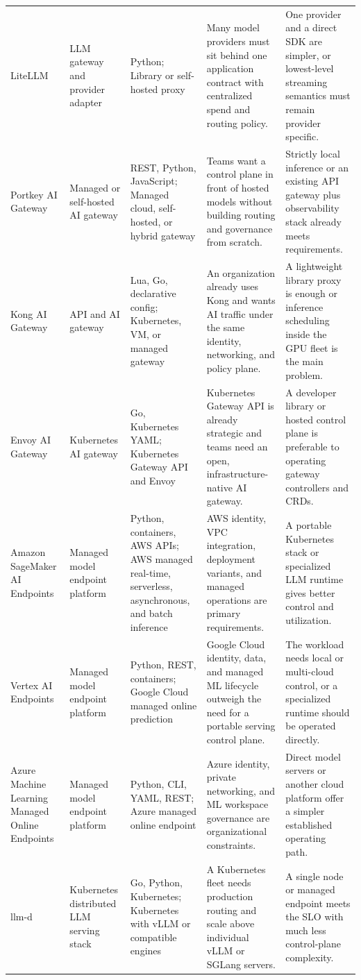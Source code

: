 \begin{longtable}{@{}p{20mm}p{22mm}p{26mm}p{46mm}p{46mm}@{}}
LiteLLM & LLM gateway and provider adapter & Python; Library or self-hosted proxy & Many model providers must sit behind one application contract with centralized spend and routing policy. & One provider and a direct SDK are simpler, or lowest-level streaming semantics must remain provider specific.\\
Portkey AI Gateway & Managed or self-hosted AI gateway & REST, Python, JavaScript; Managed cloud, self-hosted, or hybrid gateway & Teams want a control plane in front of hosted models without building routing and governance from scratch. & Strictly local inference or an existing API gateway plus observability stack already meets requirements.\\
Kong AI Gateway & API and AI gateway & Lua, Go, declarative config; Kubernetes, VM, or managed gateway & An organization already uses Kong and wants AI traffic under the same identity, networking, and policy plane. & A lightweight library proxy is enough or inference scheduling inside the GPU fleet is the main problem.\\
Envoy AI Gateway & Kubernetes AI gateway & Go, Kubernetes YAML; Kubernetes Gateway API and Envoy & Kubernetes Gateway API is already strategic and teams need an open, infrastructure-native AI gateway. & A developer library or hosted control plane is preferable to operating gateway controllers and CRDs.\\
Amazon SageMaker AI Endpoints & Managed model endpoint platform & Python, containers, AWS APIs; AWS managed real-time, serverless, asynchronous, and batch inference & AWS identity, VPC integration, deployment variants, and managed operations are primary requirements. & A portable Kubernetes stack or specialized LLM runtime gives better control and utilization.\\
Vertex AI Endpoints & Managed model endpoint platform & Python, REST, containers; Google Cloud managed online prediction & Google Cloud identity, data, and managed ML lifecycle outweigh the need for a portable serving control plane. & The workload needs local or multi-cloud control, or a specialized runtime should be operated directly.\\
Azure Machine Learning Managed Online Endpoints & Managed model endpoint platform & Python, CLI, YAML, REST; Azure managed online endpoint & Azure identity, private networking, and ML workspace governance are organizational constraints. & Direct model servers or another cloud platform offer a simpler established operating path.\\
llm-d & Kubernetes distributed LLM serving stack & Go, Python, Kubernetes; Kubernetes with vLLM or compatible engines & A Kubernetes fleet needs production routing and scale above individual vLLM or SGLang servers. & A single node or managed endpoint meets the SLO with much less control-plane complexity.\\

\end{longtable}

